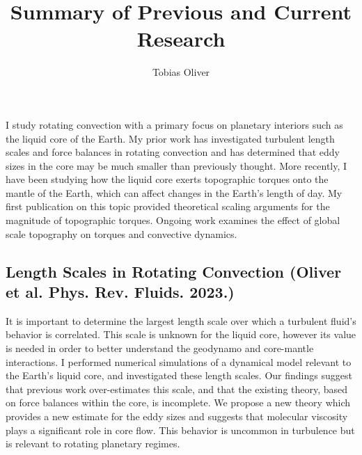 \documentclass[12pt]{article}
\title{Summary of Previous and Current Research}
\author{Tobias Oliver}
\date{}
\begin{document}
\pagestyle{fancy}
\thispagestyle{fancy}
\fancyhf{} %
\fancyhead[L]{\textcolor{red}{Tobias Oliver\\
Summary of Previous and Current Research}}
\fancyfoot[R]{\thepage}
I study rotating convection with a primary focus on planetary interiors such as the liquid core of the Earth. 
My prior work has investigated turbulent length scales and force balances in rotating convection and has determined that eddy sizes in the core may be much smaller than previously thought. 
More recently, I have been studying how the liquid core exerts topographic torques onto the mantle of the Earth, which can affect changes in the Earth's length of day. My first publication on this topic provided theoretical scaling arguments for the magnitude of topographic torques. Ongoing work examines the effect of global scale topography on torques and convective dynamics. 
\subsection*{Length Scales in Rotating Convection \small{(Oliver et al. Phys. Rev. Fluids. 2023.)}}
It is important to determine the largest length scale over which a turbulent fluid's behavior is correlated. 
This scale is unknown for the liquid core, however its value is needed in order to better understand the geodynamo and core-mantle interactions. I performed numerical simulations of a dynamical model relevant to the Earth's liquid core, and investigated these length scales. Our findings suggest that previous work over-estimates this scale, and that the existing theory, based on force balances within the core, is incomplete. We propose a new theory which provides a new estimate for the eddy sizes and suggests that molecular viscosity plays a significant role in core flow. This behavior is uncommon in turbulence but is relevant to rotating planetary regimes.
\end{document}

